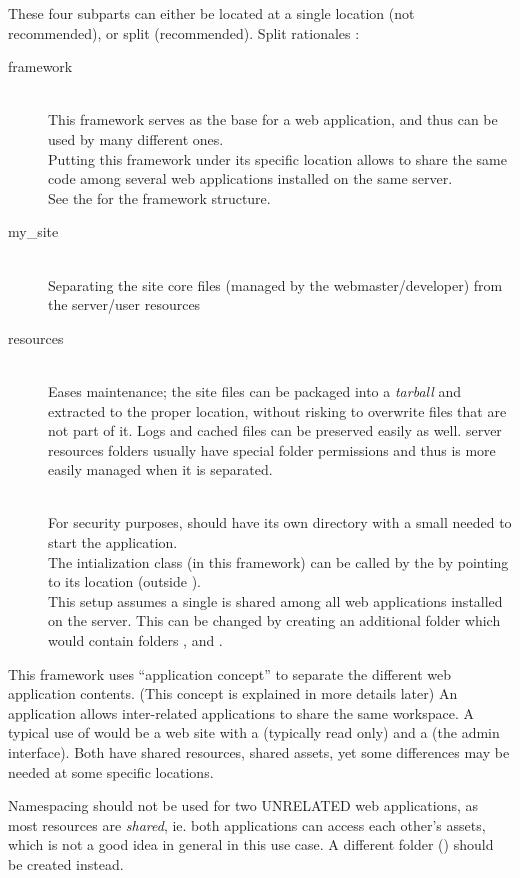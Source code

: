 \documentclass[pdftex,12pt,a4paper]{article}
\begin{document}
These four subparts can either be located at a single location (not recommended), or split (recommended).
Split rationales :
\begin{description}
    \item[framework] \hfill \\
This framework serves as the base for a web application, and thus can be used by many different ones. \\
Putting this framework under its specific location allows to share the same code among several web applications installed on the same server. \\
See the  for the framework structure.
    \item[my\_site] \hfill \\
Separating the site core files (managed by the webmaster/developer) from the server/user resources
    \item[resources] \hfill \\
Eases maintenance; the site files can be packaged into a \emph{tarball} and extracted to the proper location, without risking to overwrite files that are not part of it. Logs and cached files can be preserved easily as well.
server resources folders usually have special folder permissions and thus is more easily managed when it is separated.
    \item[] \hfill \\
For security purposes,  should have its own directory with a small  needed to start the application. \\
The intialization class  (in this framework) can be called by the  by pointing to its location (outside ). \\
This setup assumes a single  is shared among all web applications installed on the server. This can be changed by creating an additional folder  which would contain folders ,  and .
\end{description}

This framework uses ``application  concept'' to separate the different web application contents. (This concept is explained in more details later)
An application  allows inter-related applications to share the same workspace. A typical use of  would be a web site
with a  (typically read only) and a  (\eg the admin interface). Both have shared resources, shared assets, yet some differences may
be needed at some specific locations.
\begin{note}
Namespacing should not be used for two UNRELATED web applications, as most resources are \emph{shared}, ie. both applications can access
each other's assets, which is not a good idea in general in this use case. A different folder (\eg {}) should be created instead.
\end{note}
\end{document}
